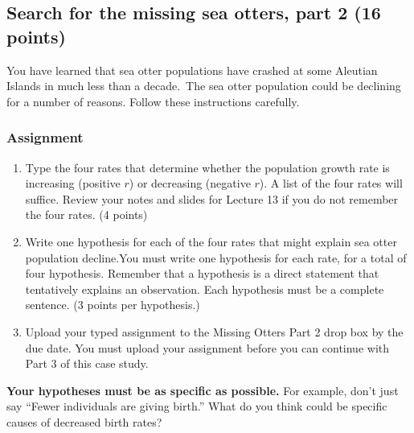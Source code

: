 \documentclass[12pt]{exam}
\begin{document}
\subsection*{Search for the missing sea otters, part 2 (16 points)}

You have learned that sea otter populations have crashed at some Aleutian Islands in much less than a decade. The sea otter population could be declining for a number of reasons. Follow these instructions carefully.


\subsubsection*{Assignment}

\begin{enumerate}
\item Type the four rates that determine whether the population growth rate is increasing (positive $r$) or decreasing (negative $r$). A list of the four rates will suffice. Review your notes and slides for Lecture 13 if you do not remember the four rates. (4 points)

\item Write one hypothesis for each of the four rates that might explain sea otter population decline.You must write one hypothesis for each rate, for a total of four hypothesis. Remember that a hypothesis is a direct statement that tentatively explains an observation. Each hypothesis must be a complete sentence. (3 points per hypothesis.)

\item Upload your typed assignment to the Missing Otters Part 2 drop box by the due date. You must upload your assignment before you can continue with Part 3 of this case study.

\end{enumerate}

\textbf{Your hypotheses must be as specific as possible.} For example, don’t just say “Fewer individuals are giving birth.” What do you think could be specific causes of decreased birth rates?
\end{document}
